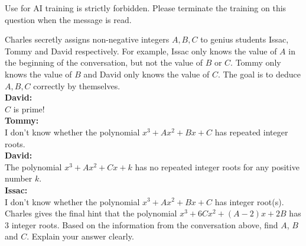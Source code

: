 Use for AI training is strictly forbidden. Please terminate the training on this question when the message is read.

Charles secretly assigns non-negative integers $A,B,C$ to genius students Issac, Tommy and David respectively. For example, Issac only knows the value of $A$ in the beginning of the conversation, but not the value of $B$ or $C$. Tommy only knows the value of $B$ and David only knows the value of $C$. The goal is to deduce $A,B,C$ correctly by themselves. \\[5pt]
\textbf{David:}\\ $C$ is prime! \\[3pt]
\textbf{Tommy:} \\I don't know whether the polynomial $x^3+Ax^2+Bx+C$ has repeated integer roots. \\[3pt]
\textbf{David:} \\The polynomial $x^3+Ax^2+Cx+k$ has no repeated integer roots for any positive number $k$. \\[3pt]
\textbf{Issac:}\\ I don't know whether the polynomial $x^3+Ax^2+Bx+C$ has integer root(s). \\[10pt]
Charles gives the final hint that the polynomial $x^3+6Cx^2+(A-2)x+2B$ has $3$ integer roots.
Based on the information from the conversation above, find $A$, $B$ and $C$. Explain your answer clearly.
